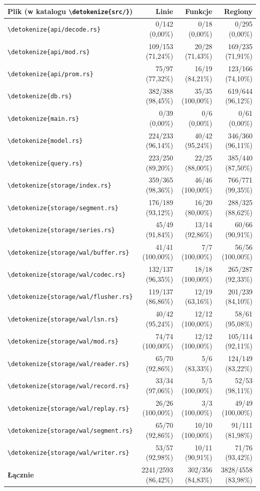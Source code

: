 \documentclass[11pt,a4paper]{article}
\newcommand{\code}[1]{\expandafter\nolinkurl\expandafter{\detokenize{#1}}}
\begin{document}
\begingroup
\footnotesize
\setlength{\tabcolsep}{4pt}
\begin{tabularx}{\linewidth}{Yrrr}
	\toprule
	Plik (w katalogu \code{src/}) & Linie               & Funkcje           & Regiony             \\ \midrule
	\code{api/decode.rs}          & 0/142 (0,00\%)      & 0/18 (0,00\%)     & 0/295 (0,00\%)      \\
	\code{api/mod.rs}             & 109/153 (71,24\%)   & 20/28 (71,43\%)   & 169/235 (71,91\%)   \\
	\code{api/prom.rs}            & 75/97 (77,32\%)     & 16/19 (84,21\%)   & 123/166 (74,10\%)   \\
	\code{db.rs}                  & 382/388 (98,45\%)   & 35/35 (100,00\%)  & 619/644 (96,12\%)   \\
	\code{main.rs}                & 0/39 (0,00\%)       & 0/6 (0,00\%)      & 0/61 (0,00\%)       \\
	\code{model.rs}               & 224/233 (96,14\%)   & 40/42 (95,24\%)   & 346/360 (96,11\%)   \\
	\code{query.rs}               & 223/250 (89,20\%)   & 22/25 (88,00\%)   & 385/440 (87,50\%)   \\
	\code{storage/index.rs}       & 359/365 (98,36\%)   & 46/46 (100,00\%)  & 766/771 (99,35\%)   \\
	\code{storage/segment.rs}     & 176/189 (93,12\%)   & 16/20 (80,00\%)   & 288/325 (88,62\%)   \\
	\code{storage/series.rs}      & 45/49 (91,84\%)     & 13/14 (92,86\%)   & 60/66 (90,91\%)     \\
	\code{storage/wal/buffer.rs}  & 41/41 (100,00\%)    & 7/7 (100,00\%)    & 56/56 (100,00\%)    \\
	\code{storage/wal/codec.rs}   & 132/137 (96,35\%)   & 18/18 (100,00\%)  & 265/287 (92,33\%)   \\
	\code{storage/wal/flusher.rs} & 119/137 (86,86\%)   & 12/19 (63,16\%)   & 201/239 (84,10\%)   \\
	\code{storage/wal/lsn.rs}     & 40/42 (95,24\%)     & 12/12 (100,00\%)  & 58/61 (95,08\%)     \\
	\code{storage/wal/mod.rs}     & 74/74 (100,00\%)    & 12/12 (100,00\%)  & 105/114 (92,11\%)   \\
	\code{storage/wal/reader.rs}  & 65/70 (92,86\%)     & 5/6 (83,33\%)     & 124/149 (83,22\%)   \\
	\code{storage/wal/record.rs}  & 33/34 (97,06\%)     & 5/5 (100,00\%)    & 52/53 (98,11\%)     \\
	\code{storage/wal/replay.rs}  & 26/26 (100,00\%)    & 3/3 (100,00\%)    & 49/49 (100,00\%)    \\
	\code{storage/wal/segment.rs} & 65/70 (92,86\%)     & 10/10 (100,00\%)  & 91/111 (81,98\%)    \\
	\code{storage/wal/writer.rs}  & 53/57 (92,98\%)     & 10/11 (90,91\%)   & 71/76 (93,42\%)     \\
	\textbf{Łącznie}              & 2241/2593 (86,42\%) & 302/356 (84,83\%) & 3828/4558 (83,98\%) \\
	\bottomrule
\end{tabularx}
\endgroup
\end{document}
